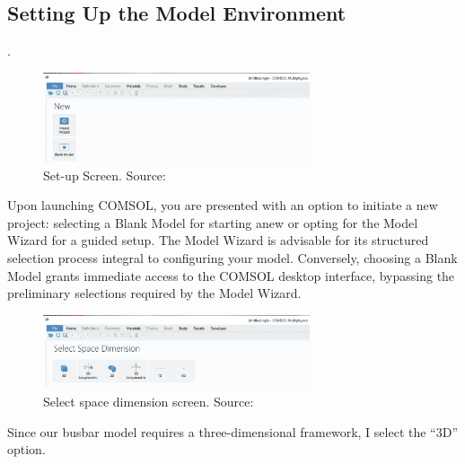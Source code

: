 \subsection{Setting Up the Model Environment}.
\begin{figure}[H]
  \centering
  \includegraphics[width=0.7\textwidth]{Chapters/Figures/Chapter 3 Figures/Set-up Screen.png}
  \caption{Set-up Screen. Source: \cite{multiphysics__modeling_nodate}}
  \label{fig:Set-up Screen}
\end{figure}

Upon launching COMSOL, you are presented with an option to initiate a new project: selecting a Blank Model for starting anew or opting for the Model Wizard for a guided setup. The Model Wizard is advisable for its structured selection process integral to configuring your model. Conversely, choosing a Blank Model grants immediate access to the COMSOL desktop interface, bypassing the preliminary selections required by the Model Wizard.

\begin{figure}[H]
  \centering
  \includegraphics[width=0.7\textwidth]{Chapters/Figures/Chapter 3 Figures/Select Space Dimension.png}
  \caption{Select space dimension screen. Source: \cite{multiphysics__modeling_nodate}}
  \label{fig:Select Space Dimension}
\end{figure}

Since our busbar model requires a three-dimensional framework, I select the ``3D'' option.

